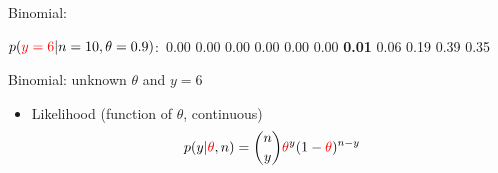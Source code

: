 \documentclass[english,t]{beamer}
\begin{document}
\begin{frame}{Binomial: }
\begin{center}
{      \vspace{-0.6\baselineskip}
      {\hspace{-22mm}\scriptsize    $p({\color{red}y=6}|n=10,\theta=0.9)$:\, 0.00 0.00 0.00 0.00 0.00 0.00 \textbf{0.01} 0.06 0.19 0.39 0.35}}
  \end{center}
\end{frame}

\begin{frame}{Binomial: unknown $\theta$ and $y=6$}

  \begin{itemize}
  \item {\color{blue}Likelihood} (function of {\color{red}$\theta$}, continuous)
    \begin{align*}
      p(y|{\color{red}\theta},n) = \binom{n}{y} {\color{red}\theta}^y(1-{\color{red}\theta})^{n-y}
    \end{align*}
  \end{itemize}


\end{frame}
\end{document}
